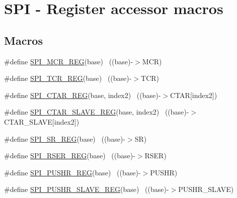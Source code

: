 \hypertarget{group___s_p_i___register___accessor___macros}{}\section{S\+PI -\/ Register accessor macros}
\label{group___s_p_i___register___accessor___macros}
\subsection*{Macros}
\begin{DoxyCompactItemize}
\item 
\#define \hyperlink{group___s_p_i___register___accessor___macros_gae54fdee07e5ec098efe6da63f34f2ecd}{S\+P\+I\+\_\+\+M\+C\+R\+\_\+\+R\+EG}(base)                                            ~((base)-\/$>$M\+CR)
\item 
\#define \hyperlink{group___s_p_i___register___accessor___macros_gac7b659989db7f592b223186299d8535e}{S\+P\+I\+\_\+\+T\+C\+R\+\_\+\+R\+EG}(base)                                            ~((base)-\/$>$T\+CR)
\item 
\#define \hyperlink{group___s_p_i___register___accessor___macros_ga5ab762c9000b796d14c1ce822eefc436}{S\+P\+I\+\_\+\+C\+T\+A\+R\+\_\+\+R\+EG}(base,  index2)                            ~((base)-\/$>$C\+T\+AR\mbox{[}index2\mbox{]})
\item 
\#define \hyperlink{group___s_p_i___register___accessor___macros_ga2025336cecfcf0c5b7cdb30e8056505b}{S\+P\+I\+\_\+\+C\+T\+A\+R\+\_\+\+S\+L\+A\+V\+E\+\_\+\+R\+EG}(base,  index2)                ~((base)-\/$>$C\+T\+A\+R\+\_\+\+S\+L\+A\+VE\mbox{[}index2\mbox{]})
\item 
\#define \hyperlink{group___s_p_i___register___accessor___macros_ga0621f5a9016db52860125b33dd3519a2}{S\+P\+I\+\_\+\+S\+R\+\_\+\+R\+EG}(base)                                              ~((base)-\/$>$SR)
\item 
\#define \hyperlink{group___s_p_i___register___accessor___macros_ga9f132bbe51ac921e48eb67afd580ed34}{S\+P\+I\+\_\+\+R\+S\+E\+R\+\_\+\+R\+EG}(base)                                          ~((base)-\/$>$R\+S\+ER)
\item 
\#define \hyperlink{group___s_p_i___register___accessor___macros_gacca7ae364ed1cf69ce3a13c76691ce63}{S\+P\+I\+\_\+\+P\+U\+S\+H\+R\+\_\+\+R\+EG}(base)                                        ~((base)-\/$>$P\+U\+S\+HR)
\item 
\#define \hyperlink{group___s_p_i___register___accessor___macros_gab2be31eae2e6d72caaac8897ed48099f}{S\+P\+I\+\_\+\+P\+U\+S\+H\+R\+\_\+\+S\+L\+A\+V\+E\+\_\+\+R\+EG}(base)                            ~((base)-\/$>$P\+U\+S\+H\+R\+\_\+\+S\+L\+A\+VE)

\end{DoxyCompactItemize}
